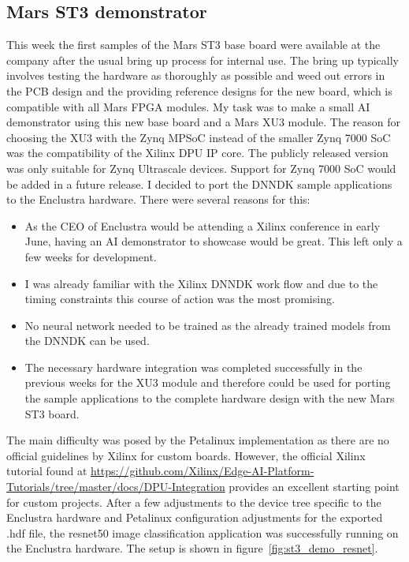\subsection{Mars ST3 demonstrator}
This week the first samples of the Mars ST3 base board were available at the company after the usual bring up process for internal use. The bring up typically involves testing the hardware as thoroughly as possible and weed out errors in the \ac{PCB} design and the providing reference designs for the new board, which is compatible with all Mars \ac{FPGA} modules. My task was to make a small \ac{AI} demonstrator using this new base board and a Mars XU3 module. The reason for choosing the XU3 with the Zynq \ac{MPSoC} instead of the smaller Zynq 7000 \ac{SoC} was the compatibility of the Xilinx \ac{DPU} \ac{IP} core. The publicly released version was only suitable for Zynq Ultrascale devices. Support for Zynq 7000 \ac{SoC} would be added in a future release. I decided to port the \ac{DNNDK} sample applications to the Enclustra hardware. There were several reasons for this:
\begin{itemize}
	\item As the CEO of Enclustra would be attending a Xilinx conference in early June, having an \ac{AI} demonstrator to showcase would be great. This left only a few weeks for development.
	\item I was already familiar with the Xilinx \ac{DNNDK} work flow and due to the timing constraints this course of action was the most promising.
	\item No neural network needed to be trained as the already trained models from the \ac{DNNDK} can be used.
	\item The necessary hardware integration was completed successfully in the previous weeks for the XU3 module and therefore could be used for porting the sample applications to the complete hardware design with the new Mars ST3 board.
\end{itemize}
The main difficulty was posed by the Petalinux implementation as there are no official guidelines by Xilinx for custom boards. However, the official Xilinx tutorial found at \href{https://github.com/Xilinx/Edge-AI-Platform-Tutorials/tree/master/docs/DPU-Integration}{https://github.com/Xilinx/Edge-AI-Platform-Tutorials/tree/master/docs/DPU-Integration} provides an excellent starting point for custom projects. After a few adjustments to the device tree specific to the Enclustra hardware and Petalinux configuration adjustments for the exported .hdf file, the resnet50 image classification application was successfully running on the Enclustra hardware. The setup is shown in figure~\ref{fig:st3_demo_resnet}.
